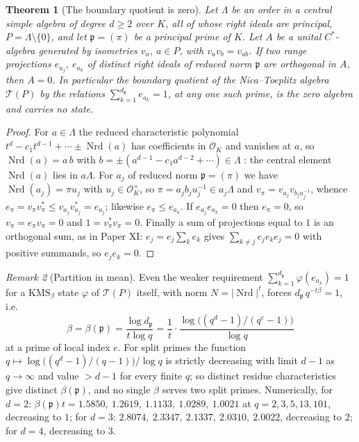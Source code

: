 \documentclass[11pt]{amsart}
\numberwithin{equation}{section}
\newtheorem{theorem}{Theorem}[section]
\theoremstyle{definition}
\theoremstyle{remark}
\newtheorem{remark}[theorem]{Remark}
\newcommand{\cO}{\mathcal{O}}
\newcommand{\cT}{\mathcal{T}}
\newcommand{\pp}{\mathfrak{p}}
\newcommand{\Nrd}{\operatorname{Nrd}}
\begin{document}
\begin{theorem}[The boundary quotient is zero]\label{thm:noboundary}
Let $\Lambda$ be an order in a central simple algebra of degree $d\ge2$ over $K$, all of
whose right ideals are principal, $P=\Lambda\setminus\{0\}$, and let $\pp=(\pi)$ be a
principal prime of $K$. Let $A$ be a unital $C^*$-algebra generated by isometries $v_a$,
$a\in P$, with $v_av_b=v_{ab}$. If two range projections $e_{a_j}$, $e_{a_k}$ of distinct
right ideals of reduced norm $\pp$ are orthogonal in $A$, then $A=0$. In particular the
boundary quotient of the Nica--Toeplitz algebra $\cT(P)$ by the relations
$\sum_{k=1}^{d_\pp}e_{a_k}=1$, at any one such prime, is the zero algebra and carries no
state.
\end{theorem}

\begin{proof}
For $a\in\Lambda$ the reduced characteristic polynomial $t^d-c_1t^{d-1}+\cdots\pm\Nrd(a)$ has
coefficients in $\cO_K$ and vanishes at $a$, so $\Nrd(a)=a\,b$ with
$b=\pm(a^{d-1}-c_1a^{d-2}+\cdots)\in\Lambda$ \cite[\S9]{Reiner}: the central element $\Nrd(a)$
lies in $a\Lambda$. For $a_j$ of reduced norm $\pp=(\pi)$ we have $\Nrd(a_j)=\pi u_j$ with
$u_j\in\cO_K^\times$, so $\pi=a_jb_ju_j^{-1}\in a_j\Lambda$ and $v_\pi=v_{a_j}v_{b_ju_j^{-1}}$,
whence $e_\pi=v_\pi v_\pi^*\le v_{a_j}v_{a_j}^*=e_{a_j}$; likewise $e_\pi\le e_{a_k}$. If
$e_{a_j}e_{a_k}=0$ then $e_\pi=0$, so $v_\pi=e_\pi v_\pi=0$ and $1=v_\pi^*v_\pi=0$. Finally a
sum of projections equal to $1$ is an orthogonal sum, as in Paper XI: $e_j=e_j\sum_ke_k$ gives
$\sum_{k\ne j}e_je_ke_j=0$ with positive summands, so $e_je_k=0$.
\end{proof}

\begin{remark}[Partition in mean]\label{rem:betavals}
Even the weaker requirement $\sum_{k=1}^{d_\pp}\varphi(e_{a_k})=1$ for a $\mathrm{KMS}_\beta$
state $\varphi$ of $\cT(P)$ itself, with norm $N=|\Nrd|^t$, forces $d_\pp\,q^{-t\beta}=1$, i.e.
\[
\beta=\beta(\pp)=\frac{\log d_\pp}{t\log q}=\frac{1}{t}\cdot\frac{\log\bigl((q^d-1)/(q^e-1)\bigr)}{\log q}
\]
at a prime of local index $e$. For split primes the function
$q\mapsto\log\bigl((q^d-1)/(q-1)\bigr)/\log q$ is strictly decreasing with limit $d-1$ as
$q\to\infty$ and value $>d-1$ for every finite $q$; so distinct residue characteristics give
distinct $\beta(\pp)$, and no single $\beta$ serves two split primes. Numerically, for
$d=2$: $\beta(\pp)t=1.5850,\ 1.2619,\ 1.1133,\ 1.0289,\ 1.0021$ at $q=2,3,5,13,101$, decreasing
to $1$; for $d=3$: $2.8074,\ 2.3347,\ 2.1337,\ 2.0310,\ 2.0022$, decreasing to $2$; for $d=4$,
decreasing to $3$.
\end{remark}
\end{document}
